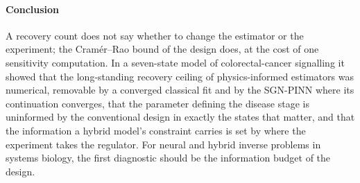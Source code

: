 \paragraph{Conclusion} A recovery count does not say whether to change the
estimator or the experiment; the Cram\'er--Rao bound of the design does, at the
cost of one sensitivity computation. In a seven-state model of colorectal-cancer signalling it
showed that the long-standing recovery ceiling of physics-informed estimators
was numerical, removable by a converged classical fit and by the SGN-PINN where
its continuation converges, that the parameter
defining the disease stage is uninformed by the conventional design in exactly
the states that matter, and that the information a hybrid model's constraint
carries is set by where the experiment takes the regulator. For neural and
hybrid inverse problems in systems biology, the first diagnostic should be the
information budget of the design.
